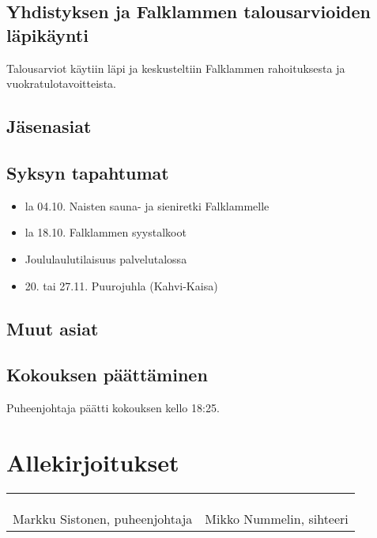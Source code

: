 \documentclass[a4paper,12pt]{article}
\begin{document}
\subsection{Yhdistyksen ja Falklammen talousarvioiden läpikäynti}
Talousarviot käytiin läpi ja keskusteltiin Falklammen rahoituksesta ja vuokratulotavoitteista.
\subsection{Jäsenasiat}
\subsection{Syksyn tapahtumat}
\begin{itemize}
\item{la 04.10. Naisten sauna- ja sieniretki Falklammelle}
\item{la 18.10. Falklammen syystalkoot}
\item{Joululaulutilaisuus palvelutalossa}
\item{20. tai 27.11. Puurojuhla (Kahvi-Kaisa)}
\end{itemize}
\subsection{Muut asiat}
\subsection{Kokouksen päättäminen}
Puheenjohtaja päätti kokouksen kello 18:25.
\section*{Allekirjoitukset}
\begin{flushleft}
\begin{tabular}{ll}
& \\
& \\
& \\
Markku Sistonen, puheenjohtaja &
Mikko Nummelin, sihteeri %
\end{tabular}
\end{flushleft}
\end{document}
